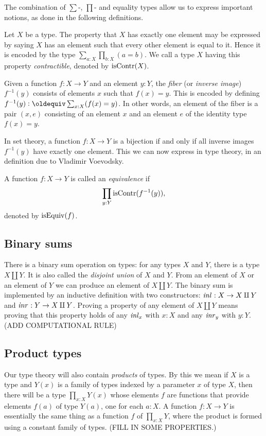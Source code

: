 The combination of $\sum$-, $\prod$- and equality types allow
us to express important notions, as done in the following
definitions.

\begin{definition}
\label{def:contractible}
Let $X$ be a type.  The property that $X$ has exactly one element may be expressed by saying $X$ has an element such that every other element is
equal to it.  Hence it is encoded by the type $\sum_{a:X} \prod_{b:X} (a=b)$.
We call a type $X$ having this property \emph{contractible}, denoted by $\mathrm{isContr}(X)$.
\end{definition}

\begin{definition}
\label{def:fiber}
Given a function $f : X \to Y$ and an element $y:Y$, the \emph{fiber} (or \emph{inverse image}) $f^{-1}(y)$ consists of elements $x$ such that $f(x)
= y$.  This is encoded by defining $f^{-1}(y) \defeq \sum_{x:X} (f(x) = y)$.  In other words, an element of the fiber is a pair $(x,e)$ consisting
of an element $x$ and an element $e$ of the identity type $f(x) = y$.
\end{definition}

In set theory, a function $f : X \to Y$ is a bijection if and only if
all inverse images $f^{-1}(y)$ have exactly one element.
This we can now express in type theory, in an definition due
to Vladimir Voevodsky. 

\begin{definition}
\label{def:equivalence}
A function $f : X \to Y$ is called an \emph{equivalence} if
\[
\prod_{y:Y} \mathrm{isContr}(f^{-1}(y)),
\]
denoted by $\mathrm{isEquiv}(f)$.
\end{definition}

\subsection{Binary sums}
\label{sec:binsum-types}
There is a binary sum operation on types: for any types $X$ and $Y$, there is a type $X \amalg Y$.  It is also called the \emph{disjoint union}
of $X$ and $Y$.  From an element of $X$ or an element of $Y$ we can produce an element of $X \amalg Y$.  The binary sum is implemented by an
inductive definition with two constructors: $\mathop{{\it inl}_{}} : X \to X \amalg Y$ and
$\mathop{{\it inr}_{}} : Y \to X \amalg Y$. Proving a property of any element of $X \amalg Y$
means proving that this property holds of any $\mathop{{\it inl}_{x}}$ with $x:X$ and any
$\mathop{{\it inr}_{y}}$ with $y:Y$. (ADD COMPUTATIONAL RULE)

\subsection{Product types}
\label{sec:product-types}
Our type theory will also contain \emph{products} of types.  By this we mean if $X$ is a type and $Y(x)$ is a family of types indexed by a
parameter $x$ of type $X$, then there will be a type $\prod _{x:X} Y(x)$ whose elements $f$ are functions that provide elements $f(a)$ of type
$Y(a)$, one for each $a:X$.  A function $f : X \to Y$ is essentially the same thing as a function $f$ of $\prod_{x:X} Y$, where the product is
formed using a constant family of types.  (FILL IN SOME PROPERTIES.)

